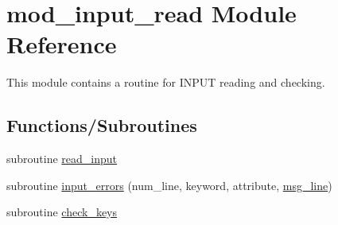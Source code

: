 \hypertarget{namespacemod__input__read}{}\section{mod\+\_\+input\+\_\+read Module Reference}
\label{namespacemod__input__read}


This module contains a routine for I\+N\+P\+UT reading and checking.  


\subsection*{Functions/\+Subroutines}
\begin{DoxyCompactItemize}
\item 
subroutine \hyperlink{namespacemod__input__read_af75d5f3259d3fca6d4fbbcd22059b6bd}{read\+\_\+input}
\item 
subroutine \hyperlink{namespacemod__input__read_ad163e91aef370c527c6a762f58f43f34}{input\+\_\+errors} (num\+\_\+line, keyword, attribute, \hyperlink{namespacemod__input__read_a2aa6f72008491094c0c96753d8d63d2e}{msg\+\_\+line})
\item 
subroutine \hyperlink{namespacemod__input__read_a396026faa10ab3698196930dfb90690b}{check\+\_\+keys}
\end{DoxyCompactItemize}
